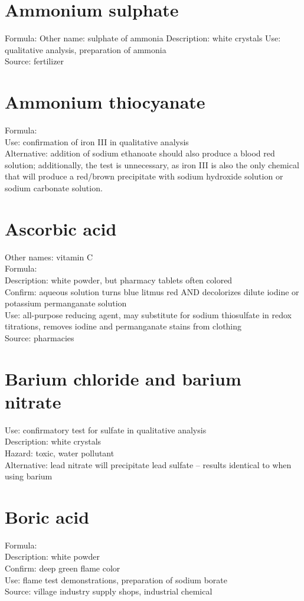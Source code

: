 \section{Ammonium sulphate}
Formula: 
Other name: sulphate of ammonia
Description: white crystals
Use: qualitative analysis, preparation of ammonia\\
Source: fertilizer

\section{Ammonium thiocyanate}
Formula: \\
Use: confirmation of iron III in qualitative analysis\\
Alternative: addition of sodium ethanoate 
should also produce a blood red solution; 
additionally, 
the test is unnecessary, 
as iron III is also the only chemical 
that will produce a red/brown precipitate with sodium hydroxide solution 
or sodium carbonate solution.

\section{Ascorbic acid}
Other names: vitamin C\\
Formula: \\
Description: white powder, 
but pharmacy tablets often colored\\
Confirm: aqueous solution turns blue litmus red 
AND decolorizes dilute iodine or potassium permanganate solution\\
Use: all-purpose reducing agent, 
may substitute for sodium thiosulfate in redox titrations, 
removes iodine and permanganate stains from clothing\\
Source: pharmacies

\section{Barium chloride and barium nitrate}
Use: confirmatory test for sulfate in qualitative analysis\\
Description: white crystals\\
Hazard: toxic, 
water pollutant\\
Alternative: lead nitrate will precipitate lead sulfate – 
results identical to when using barium

\section{Boric acid}
Formula: \\
Description: white powder\\
Confirm: deep green flame color\\
Use: flame test demonstrations, preparation of sodium borate\\
Source: village industry supply shops, industrial chemical


